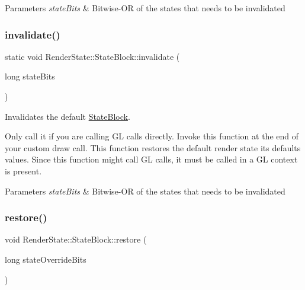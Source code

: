 \begin{DoxyParams}{Parameters}
{\em state\+Bits} & Bitwise-\/\+OR of the states that needs to be invalidated \\
\hline
\end{DoxyParams}
\mbox{\label{classRenderState_1_1StateBlock_a777ec9909867662d30fd6f76bd18421c}} 
\subsubsection{\texorpdfstring{invalidate()}{invalidate()}\hspace{0.1cm}{\footnotesize\ttfamily [2/2]}}
{\footnotesize\ttfamily static void Render\+State\+::\+State\+Block\+::invalidate (\begin{DoxyParamCaption}\item[{long}]{state\+Bits }\end{DoxyParamCaption})\hspace{0.3cm}{\ttfamily [static]}}

Invalidates the default \hyperlink{classRenderState_1_1StateBlock}{State\+Block}.

Only call it if you are calling GL calls directly. Invoke this function at the end of your custom draw call. This function restores the default render state its defaults values. Since this function might call GL calls, it must be called in a GL context is present.


\begin{DoxyParams}{Parameters}
{\em state\+Bits} & Bitwise-\/\+OR of the states that needs to be invalidated \\
\hline
\end{DoxyParams}
\mbox{\label{classRenderState_1_1StateBlock_aa8ce56d1294d4afd7908fa6de4ea00d8}} 
\subsubsection{\texorpdfstring{restore()}{restore()}\hspace{0.1cm}{\footnotesize\ttfamily [1/2]}}
{\footnotesize\ttfamily void Render\+State\+::\+State\+Block\+::restore (\begin{DoxyParamCaption}\item[{long}]{state\+Override\+Bits }\end{DoxyParamCaption})\hspace{0.3cm}{\ttfamily [static]}}

